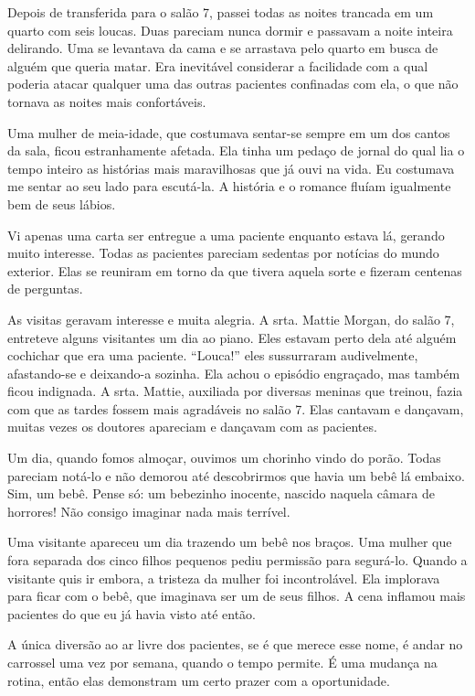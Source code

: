 Depois de transferida para o salão 7, passei todas as noites trancada em
um quarto com seis loucas. Duas pareciam nunca dormir e passavam a noite
inteira delirando. Uma se levantava da cama e se arrastava pelo quarto
em busca de alguém que queria matar. Era inevitável considerar a
facilidade com a qual poderia atacar qualquer uma das outras pacientes
confinadas com ela, o que não tornava as noites mais confortáveis.

Uma mulher de meia-idade, que costumava sentar-se sempre em um dos
cantos da sala, ficou estranhamente afetada. Ela tinha um pedaço de
jornal do qual lia o tempo inteiro as histórias mais maravilhosas que já
ouvi na vida. Eu costumava me sentar ao seu lado para escutá-la. A
história e o romance fluíam igualmente bem de seus lábios.

Vi apenas uma carta ser entregue a uma paciente enquanto estava lá,
gerando muito interesse. Todas as pacientes pareciam sedentas por
notícias do mundo exterior. Elas se reuniram em torno da que tivera
aquela sorte e fizeram centenas de perguntas.

As visitas geravam interesse e muita alegria. A srta. Mattie Morgan, do
salão 7, entreteve alguns visitantes um dia ao piano. Eles estavam perto
dela até alguém cochichar que era uma paciente. ``Louca!'' eles
sussurraram audivelmente, afastando-se e deixando-a sozinha. Ela achou o
episódio engraçado, mas também ficou indignada. A srta. Mattie,
auxiliada por diversas meninas que treinou, fazia com que as tardes fossem
mais agradáveis no salão 7. Elas cantavam e dançavam, muitas vezes os
doutores apareciam e dançavam com as pacientes.

Um dia, quando fomos almoçar, ouvimos um chorinho vindo do porão. Todas
pareciam notá-lo e não demorou até descobrirmos que havia um bebê lá
embaixo. Sim, um bebê. Pense só: um bebezinho inocente, nascido naquela
câmara de horrores! Não consigo imaginar nada mais terrível.

Uma visitante apareceu um dia trazendo um bebê nos braços. Uma mulher
que fora separada dos cinco filhos pequenos pediu permissão para
segurá-lo. Quando a visitante quis ir embora, a tristeza da mulher foi
incontrolável. Ela implorava para ficar com o bebê, que imaginava ser um
de seus filhos. A cena inflamou mais pacientes do que eu já havia visto
até então.

A única diversão ao ar livre dos pacientes, se é que merece esse nome,
é andar no carrossel uma vez por semana, quando o tempo permite. É uma
mudança na rotina, então elas demonstram um certo prazer com a
oportunidade.

